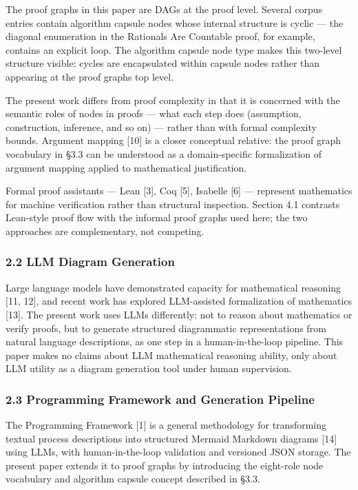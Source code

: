 \documentclass[
  11pt]{article}
\begin{document}
The proof graphs in this paper are DAGs at the proof level. Several
corpus entries contain algorithm capsule nodes whose internal structure
is cyclic --- the diagonal enumeration in the Rationals Are Countable
proof, for example, contains an explicit loop. The algorithm capsule
node type makes this two-level structure visible: cycles are
encapsulated within capsule nodes rather than appearing at the proof
graph\textquotesingle s top level.

The present work differs from proof complexity in that it is concerned
with the semantic roles of nodes in proofs --- what each step does
(assumption, construction, inference, and so on) --- rather than with
formal complexity bounds. Argument mapping {[}10{]} is a closer
conceptual relative: the proof graph vocabulary in §3.3 can be
understood as a domain-specific formalization of argument mapping
applied to mathematical justification.

Formal proof assistants --- Lean {[}3{]}, Coq {[}5{]}, Isabelle {[}6{]}
--- represent mathematics for machine verification rather than
structural inspection. Section 4.1 contrasts Lean-style proof flow with
the informal proof graphs used here; the two approaches are
complementary, not competing.

\hypertarget{22-llm-diagram-generation}{%
\subsubsection{2.2 LLM Diagram
Generation}\label{22-llm-diagram-generation}}

Large language models have demonstrated capacity for mathematical
reasoning {[}11, 12{]}, and recent work has explored LLM-assisted
formalization of mathematics {[}13{]}. The present work uses LLMs
differently: not to reason about mathematics or verify proofs, but to
generate structured diagrammatic representations from natural language
descriptions, as one step in a human-in-the-loop pipeline. This paper
makes no claims about LLM mathematical reasoning ability, only about LLM
utility as a diagram generation tool under human supervision.

\hypertarget{23-programming-framework-and-generation-pipeline}{%
\subsubsection{2.3 Programming Framework and Generation
Pipeline}\label{23-programming-framework-and-generation-pipeline}}

The Programming Framework {[}1{]} is a general methodology for
transforming textual process descriptions into structured Mermaid
Markdown diagrams {[}14{]} using LLMs, with human-in-the-loop validation
and versioned JSON storage. The present paper extends it to proof graphs
by introducing the eight-role node vocabulary and algorithm capsule
concept described in §3.3.
\end{document}
